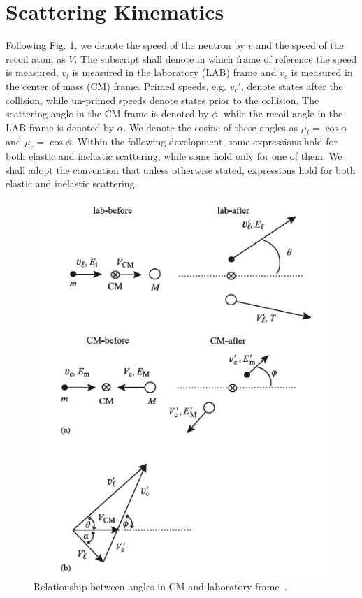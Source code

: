 \documentclass[review]{elsarticle}
\begin{document}
\section{Scattering Kinematics}

Following Fig. \ref{fig:kinematic_sketch}, we denote the speed of the neutron by $v$ and the speed of the recoil atom as $V$. The subscript shall denote in which frame of reference the speed is measured, $v_l$ is measured in the laboratory (LAB) frame and $v_c$ is measured in the center of mass (CM) frame. Primed speeds, e.g. $v_c'$, denote states after the collision, while un-primed speeds denote states prior to the collision. 
The scattering angle in the CM frame is denoted by $\phi$, while the recoil angle in the LAB frame is denoted by $\alpha$. We denote the cosine of these angles as $\mu_l = \cos \alpha$ and $\mu_c = \cos \phi$.
Within the following development, some expressions hold for both elastic and inelastic scattering, while some hold only for one of them. We shall adopt the convention that unless otherwise stated, expressions hold for both elastic and inelastic scattering.


\begin{figure}
	\centering
	\includegraphics[width=0.8\linewidth]{triangles_GWas}
	\caption{Relationship between angles in CM and laboratory frame~\cite{GaryWas}.}
	\label{fig:kinematic_sketch}
\end{figure}
\end{document}
